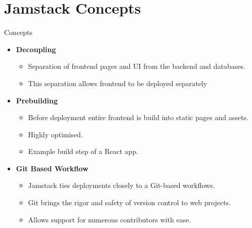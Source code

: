 \documentclass[aspectratio=169,9pt]{beamer}
\begin{document}
\section{Jamstack Concepts}
\begin{frame}{Concepts}
    \begin{itemize}
        \item \textbf{Decoupling} 
        \vspace{.5em}
        \begin{itemize}
        \setlength{\itemsep}{.4em}
            \item Separation of frontend pages and UI from the backend and databases.
            \item This separation allows frontend to be deployed separately
        \end{itemize}
        \vspace{1em}
        \item \textbf{Prebuilding}
        \vspace{.5em}
        \begin{itemize}
        \setlength{\itemsep}{.4em}
            \item Before deployment entire frontend is build into static pages and assets.
            \item Highly optimised.
            \item Example build step of a React app.
        \end{itemize}
        \vspace{1em}
        \item \textbf{Git Based Workflow}
        \vspace{.5em}
        \begin{itemize}
        \setlength{\itemsep}{.4em}
            \item Jamstack ties deployments closely to a Git-based workflows.
            \item Git brings the rigor and safety of version control to web projects.
            \item Allows support for numerous contributors with ease.
        \end{itemize}
    \end{itemize}
    
\end{frame}
\end{document}
